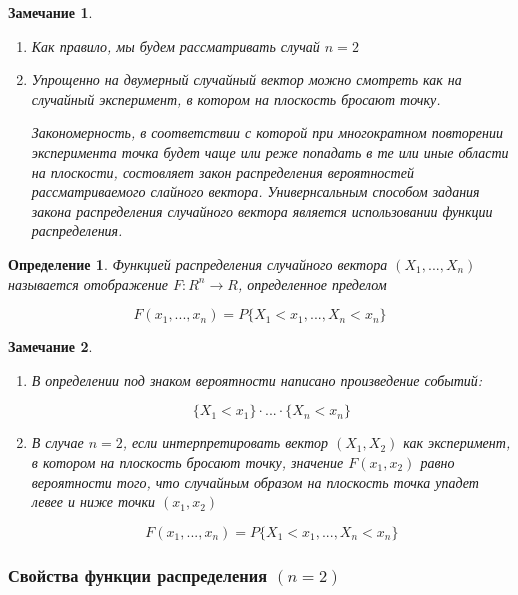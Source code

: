 \documentclass[a4paper, 14pt]{report}
\newtheorem{defenition}{Определение}[section]
\newtheorem{note}{Замечание}[section]
\begin{document}
\begin{note}
    \begin{enumerate}
        \item Как правило, мы будем рассматривать случай $n=2$
        \item Упрощенно на двумерный случайный вектор можно смотреть как на случайный эксперимент, в котором на плоскость бросают точку.

            Закономерность, в соответствии с которой при многократном повторении эксперимента точка будет чаще или реже попадать в те или иные области на плоскости, состовляет закон распределения вероятностей рассматриваемого слайного вектора. Универнсальным способом задания закона распределения случайного вектора является использовании функции распределения.
    \end{enumerate}
\end{note}

\begin{defenition}
    Функцией распределения случайного вектора $(X_1, ..., X_n)$ называется отображение $F: R^n \to R$, определенное пределом

    $$
    F(x_1,...,x_n) = P\{X_1 < x_1,..., X_n < x_n\}
    $$
\end{defenition}

\begin{note}
    \begin{enumerate}
        \item В определении под знаком вероятности написано произведение событий:

            $$
            \{X_1 < x_1\} \cdot ... \cdot \{X_n < x_n\}
            $$

        \item В случае $n=2$, если интерпретировать вектор $(X_1,X_2)$ как эксперимент, в котором на плоскость бросают точку, значение $F(x_1,x_2)$ равно вероятности того, что случайным образом на плоскость точка упадет левее и ниже точки $(x_1,x_2)$

            $$
            F(x_1,...,x_n) = P\{X_1 < x_1,..., X_n < x_n\}
            $$
    \end{enumerate}
\end{note}

\subsubsection{Свойства функции распределения $(n = 2)$}
\end{document}
